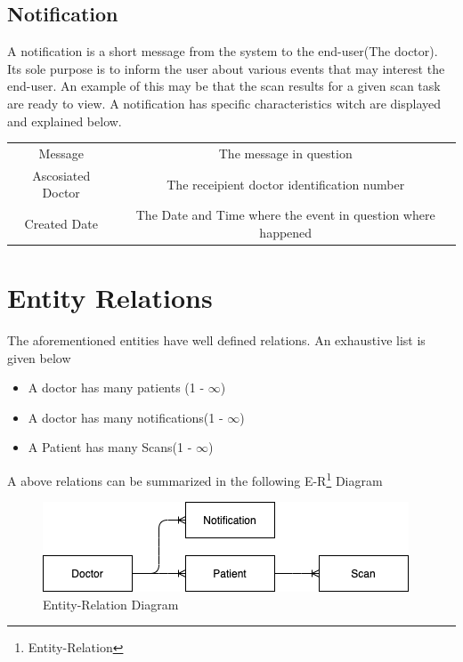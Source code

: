 	\subsection{Notification}
	\label{notification-definition}
	A notification is a short message from the system to the end-user(The doctor). Its sole purpose is to inform the user about
	various events that may interest the end-user. An example of this may be that the scan results for a given scan task are ready 
	to view. A notification has specific characteristics witch are displayed and explained below.
	\begin{center}
		\begin{tabular}{ |c|c| } 
			\hline
			Message & The message in question\\
			Ascosiated Doctor & The receipient doctor identification number \\
			Created Date & The Date and Time where the event in question where happened\\
			\hline
		\end{tabular}
	\end{center}
	\section{Entity Relations}
	The aforementioned entities have well defined relations. An exhaustive list is given below
	\begin{itemize}
		\item A doctor has many patients (1 - $\infty$)
		\item A doctor has many notifications(1 - $\infty$)
		\item A Patient has many Scans(1 - $\infty$)
	\end{itemize}
	A above relations can be summarized in the following E-R\footnote{Entity-Relation} Diagram
	\begin{figure}[H]
		\iftrue
		\centering
		\caption{Entity-Relation Diagram}
		\includegraphics[scale=0.5]{figures/Entity-Relation-Fig}
		\fi
	\end{figure}


